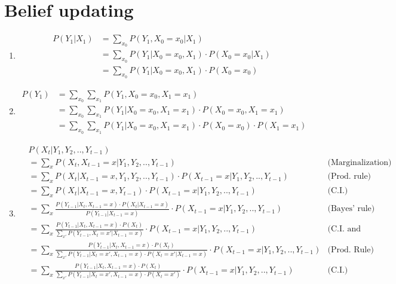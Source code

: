 \documentclass[11]{article}
\begin{document}
\section{Belief updating}
\begin{enumerate}[label=(\alph*)]
\item
\begin{align*}
P(Y_1|X_1)&=\sum_{x_0} P(Y_1,X_0=x_0|X_1)\\
&=\sum_{x_0} P(Y_1|X_0=x_0,X_1) \cdot P(X_0=x_0|X_1)\\
&=\sum_{x_0} P(Y_1|X_0=x_0,X_1) \cdot P(X_0=x_0)
\end{align*}

\item
\begin{align*}
P(Y_1)&=\sum_{x_0} \sum_{x_1} P(Y_1,X_0=x_0,X_1=x_1)\\
&=\sum_{x_0} \sum_{x_1} P(Y_1|X_0=x_0,X_1=x_1) \cdot P(X_0=x_0,X_1=x_1)\\
&=\sum_{x_0} \sum_{x_1} P(Y_1|X_0=x_0,X_1=x_1) \cdot P(X_0=x_0) \cdot P(X_1=x_1)
\end{align*}

\item
\begin{align*}
& P(X_t|Y_1,Y_2,..,Y_{t-1})\\
&=\sum_x P(X_t, X_{t-1}=x|Y_1,Y_2,..,Y_{t-1}) & \text{(Marginalization)}\\
&=\sum_x P(X_t|X_{t-1}=x,Y_1,Y_2,..,Y_{t-1}) \cdot P(X_{t-1}=x|Y_1,Y_2,..,Y_{t-1}) & \text{(Prod. rule)}\\
&=\sum_x P(X_t|X_{t-1}=x,Y_{t-1}) \cdot P(X_{t-1}=x|Y_1,Y_2,..,Y_{t-1}) & \text{(C.I.)}\\
&=\sum_x \frac{P(Y_{t-1}|X_t,X_{t-1}=x) \cdot P(X_t|X_{t-1}=x)}{P(Y_{t-1}|X_{t-1}=x)} \cdot P(X_{t-1}=x|Y_1,Y_2,..,Y_{t-1}) & \text{(Bayes' rule)}\\
&=\sum_x \frac{P(Y_{t-1}|X_t,X_{t-1}=x) \cdot P(X_t)}{\sum_{x'}P(Y_{t-1},X_t=x'|X_{t-1}=x)} \cdot P(X_{t-1}=x|Y_1,Y_2,..,Y_{t-1}) & \text{(C.I. and Marginalization)}\\
&=\sum_x \frac{P(Y_{t-1}|X_t,X_{t-1}=x) \cdot P(X_t)}{\sum_{x'}P(Y_{t-1}|X_t=x',X_{t-1}=x) \cdot P(X_t=x'|X_{t-1}=x)} \cdot P(X_{t-1}=x|Y_1,Y_2,..,Y_{t-1}) & \text{(Prod. Rule)}\\
&=\sum_x \frac{P(Y_{t-1}|X_t,X_{t-1}=x) \cdot P(X_t)}{\sum_{x'}P(Y_{t-1}|X_t=x',X_{t-1}=x) \cdot P(X_t=x')} \cdot P(X_{t-1}=x|Y_1,Y_2,..,Y_{t-1}) & \text{(C.I.)}\\
\end{align*}


\end{enumerate}
\end{document}
